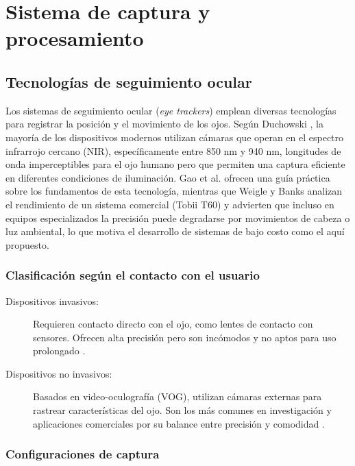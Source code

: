 \section{Sistema de captura y procesamiento}

\subsection{Tecnologías de seguimiento ocular}

Los sistemas de seguimiento ocular (\textit{eye trackers}) emplean diversas tecnologías para registrar la posición y el movimiento de los ojos. Según Duchowski \cite{duchowski2017}, la mayoría de los dispositivos modernos utilizan cámaras que operan en el espectro infrarrojo cercano (NIR), específicamente entre 850 nm y 940 nm, longitudes de onda imperceptibles para el ojo humano pero que permiten una captura eficiente en diferentes condiciones de iluminación. Gao et al. \cite{gao2025eye_tracking_tutorial} ofrecen una guía práctica sobre los fundamentos de esta tecnología, mientras que Weigle y Banks \cite{weigle2008analysis} analizan el rendimiento de un sistema comercial (Tobii T60) y advierten que incluso en equipos especializados la precisión puede degradarse por movimientos de cabeza o luz ambiental, lo que motiva el desarrollo de sistemas de bajo costo como el aquí propuesto.

\subsubsection{Clasificación según el contacto con el usuario}

\begin{description}
	\item[Dispositivos invasivos:] Requieren contacto directo con el ojo, como lentes de contacto con sensores. Ofrecen alta precisión pero son incómodos y no aptos para uso prolongado \cite{duchowski2017}.
	
	\item[Dispositivos no invasivos:] Basados en video-oculografía (VOG), utilizan cámaras externas para rastrear características del ojo. Son los más comunes en investigación y aplicaciones comerciales por su balance entre precisión y comodidad \cite{duchowski2017}.
\end{description}

\subsubsection{Configuraciones de captura}

